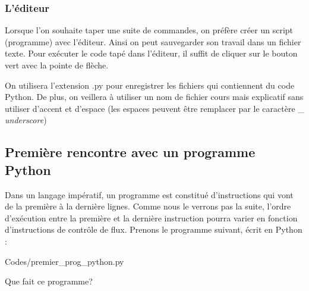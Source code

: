\documentclass[11pt, a4paper]{book}
\begin{document}
\subsubsection{L'éditeur}
Lorsque l'on souhaite taper une suite de commandes, on préfère créer un script (programme) avec l'éditeur. Ainsi on peut sauvegarder son travail dans un fichier texte. Pour exécuter le code tapé dans l'éditeur, il suffit de cliquer sur le bouton vert avec la pointe de flèche.
\begin{important}
	On utilisera l'extension .py pour enregistrer les fichiers qui contiennent du code Python. De plus, on veillera à utiliser un nom de fichier cours mais explicatif sans utiliser d'accent et d'espace (les espaces peuvent être remplacer par le caractère \_ \textit{underscore})
\end{important}


\subsection{Première rencontre avec un programme Python}
Dans un langage impératif, un programme est constitué d'instructions qui vont de la première à la dernière lignes. Comme nous le verrons pas la suite, l'ordre d'exécution entre la première et la dernière instruction pourra varier en fonction d'instructions de contrôle de flux. Prenons le programme suivant, écrit en Python :

\vspace{-0.7cm}
\begin{monprogramme}
	
	{Codes/premier_prog_python.py}
\end{monprogramme}
%
\begin{question}
	Que fait ce programme?
\end{question}
\end{document}
